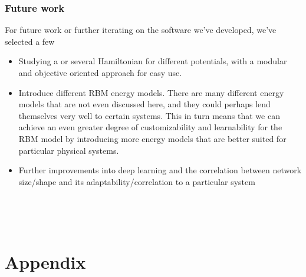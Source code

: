 \documentclass[12pt]{article}
\begin{document}
{\section{Future work}
For future work or further iterating on the software we've developed, we've selected a few
\begin{itemize}
    \item Studying a or several Hamiltonian for different potentials, with a modular and objective oriented approach for easy use.
    \item Introduce different RBM energy models. There are many different energy models that are not even discussed here, and they could perhaps lend themselves very well to certain systems. This in turn means that we can achieve an even greater degree of customizability and learnability for the RBM model by introducing more energy models that are better suited for particular physical systems.
    \item Further improvements into deep learning and the correlation between network size/shape and its adaptability/correlation to a particular system
\end{itemize}
\newpage
~\newpage


\newpage
~\newpage
\setcounter{part}{0}
\renewcommand{\thepart}{\Alph{part}}
\renewcommand{\thesection}{\alph{section}}
\part{Appendix}
}
\end{document}
